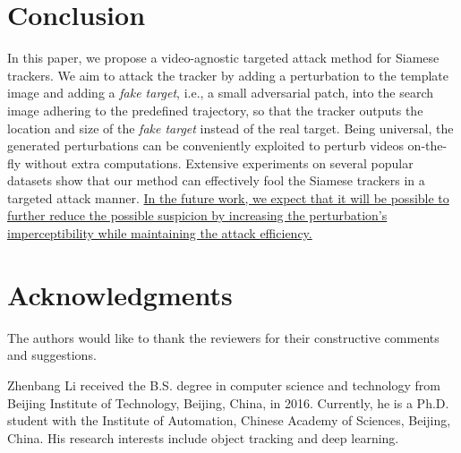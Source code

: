 \documentclass[journal]{IEEEtran}
\newcommand{\ie}{i.e.}
\begin{document}
\section{Conclusion}

In this paper, we propose a video-agnostic targeted attack method for Siamese trackers. 
We aim to attack the tracker by adding a perturbation to the template image and adding a \textit{fake target}, \ie, a small adversarial patch, into the search image adhering to the predefined trajectory, so that the tracker outputs the location and size of the \textit{fake target} instead of the real target. Being universal, the generated perturbations can be conveniently exploited to perturb videos on-the-fly without extra computations.
Extensive experiments on several popular datasets show that our method can effectively fool the Siamese trackers in a targeted attack manner.
\uline{In the future work, we expect that it will be possible to further reduce the possible suspicion by increasing the perturbation's imperceptibility while maintaining the attack efficiency.}

\section*{Acknowledgments}
The authors would like to thank the reviewers for their constructive comments and suggestions.

\normalem



\begin{IEEEbiography}
{Zhenbang Li}
received the B.S. degree in computer science and technology from Beijing Institute of Technology, Beijing, China, in 2016. Currently, he is a Ph.D. student with the Institute of Automation, Chinese Academy of Sciences, Beijing, China. His research interests include object tracking and deep learning.
\end{IEEEbiography}
\end{document}
